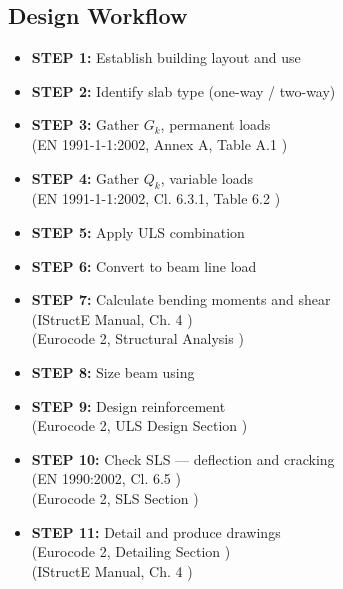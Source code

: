 \subsection{Design Workflow}
\begin{itemize}
  \item \textbf{STEP 1:} Establish building layout and use

  \item \textbf{STEP 2:} Identify slab type (one-way / two-way)

  \item \textbf{STEP 3:} Gather \(G_k\), permanent loads \\
  (EN 1991-1-1:2002, Annex A, Table A.1 \cite{EN1991-1-1-2002(3)})

  \item \textbf{STEP 4:} Gather \(Q_k\), variable loads \\
  (EN 1991-1-1:2002, Cl. 6.3.1, Table 6.2 \cite{EN1991-1-1-2002(3)})

  \item \textbf{STEP 5:} Apply ULS combination

  \item \textbf{STEP 6:} Convert to beam line load

  \item \textbf{STEP 7:} Calculate bending moments and shear \\
  (IStructE Manual, Ch. 4 \cite{IStructE2006(6)}) \\
  (Eurocode 2, Structural Analysis \cite{EN1992-1-1-2023(1)})

  \item \textbf{STEP 8:} Size beam using

  \item \textbf{STEP 9:} Design reinforcement \\
  (Eurocode 2, ULS Design Section \cite{EN1992-1-1-2023(1)})

  \item \textbf{STEP 10:} Check SLS — deflection and cracking \\
  (EN 1990:2002, Cl. 6.5 \cite{EN1990-2002(5)}) \\
  (Eurocode 2, SLS Section \cite{EN1992-1-1-2023(1)})

  \item \textbf{STEP 11:} Detail and produce drawings \\
  (Eurocode 2, Detailing Section \cite{EN1992-1-1-2023(1)}) \\
  (IStructE Manual, Ch. 4 \cite{IStructE2006(6)})
\end{itemize}
